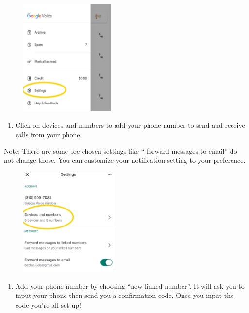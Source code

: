 \documentclass[]{book}
\providecommand{\tightlist}{%
  \setlength{\itemsep}{0pt}\setlength{\parskip}{0pt}}
\begin{document}
\begin{figure}
\centering
\includegraphics{images/research_protocols/google_voice/pic5.png}
\caption{}
\end{figure}

\begin{enumerate}
\def\labelenumi{\arabic{enumi})}
\setcounter{enumi}{5}
\tightlist
\item
  Click on devices and numbers to add your phone number to send and receive calls from your phone.
\end{enumerate}

Note: There are some pre-chosen settings like `` forward messages to email'' do not change those. You can customize your notification setting to your preference.

\begin{figure}
\centering
\includegraphics{images/research_protocols/google_voice/pic6.png}
\caption{}
\end{figure}

\begin{enumerate}
\def\labelenumi{\arabic{enumi})}
\setcounter{enumi}{6}
\tightlist
\item
  Add your phone number by choosing ``new linked number''. It will ask you to input your phone then send you a confirmation code. Once you input the code you're all set up!
\end{enumerate}
\end{document}

